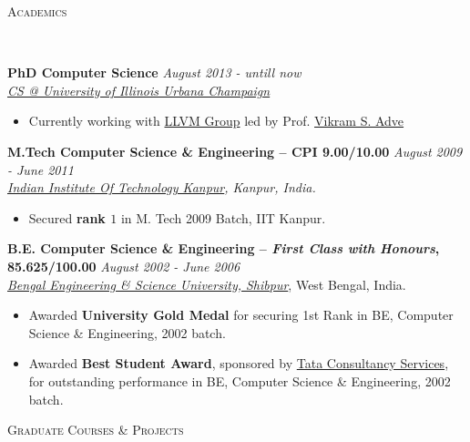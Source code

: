 \documentclass[9pt]{article}
\newenvironment{changemargin}[2]{%
  \begin{list}{}{%
    \setlength{\topsep}{0pt}%
    \setlength{\leftmargin}{#1}%
    \setlength{\rightmargin}{#2}%
    \setlength{\listparindent}{\parindent}%
    \setlength{\itemindent}{\parindent}%
    \setlength{\parsep}{\parskip}%
  }%
  \item[]}{\end{list}
}
\newcommand{\lineover}{
	\begin{changemargin}{-0.05in}{-0.05in}
		\vspace*{-8pt}
		\hrulefill \\
		\vspace*{-2pt}
	\end{changemargin}
}
\newcommand{\header}[1]{
	\begin{changemargin}{-0.5in}{-0.5in}
		\scshape{#1}\\
  	\lineover
	\end{changemargin}
}
\newenvironment{body} {
	\vspace*{-16pt}
	\begin{changemargin}{-0.25in}{-0.5in}
  }	
	{\end{changemargin}
}
\begin{document}
\smallskip


\header{Academics}

\begin{body}
	\vspace{14pt}
	\textbf{PhD Computer Science }{} \hfill \emph{August 2013 - untill now}{} \\
	\emph{\href{http://cs.illinois.edu/}{CS @ University of Illinois Urbana Champaign}}{} \\
	\begin{itemize} \itemsep -0pt
		\item Currently working with \href{http://llvm.org/}{ LLVM Group} led by Prof. \href{http://web.engr.illinois.edu/~vadve/Home.html}{Vikram S. Adve}
	\end{itemize}
 \medskip
	\textbf{M.Tech Computer Science \& Engineering -- CPI 9.00/10.00}{} \hfill \emph{August 2009 - June 2011}{} \\
	\emph{\href{http://www.iitk.ac.in/}{Indian Institute Of Technology Kanpur}, Kanpur, India.}{} \\
	\begin{itemize} \itemsep -0pt
		\item Secured \textbf{rank $1$} in M. Tech 2009 Batch, IIT Kanpur.
	\end{itemize}
  \medskip
	\textbf{B.E. Computer Science \& Engineering -- \emph{First Class with Honours}, 85.625/100.00} \hfill \emph{August 2002 - June 2006} \\
	\emph{\href{http://www.becs.ac.in/}{Bengal Engineering \& Science University, Shibpur}}, West Bengal, India.\\
	\begin{itemize} \itemsep -0pt
		\item Awarded \textbf{University Gold Medal} for securing 1st Rank in BE, Computer Science \& Engineering, 2002 batch.
		\item Awarded \textbf{Best Student Award}, sponsored by \href{http://www.tcs.com}{Tata Consultancy Services}, for outstanding performance in BE, Computer Science \& Engineering, 2002 batch.
	\end{itemize}
\end{body}

\smallskip

\header{Graduate Courses \& Projects}
\end{document}
